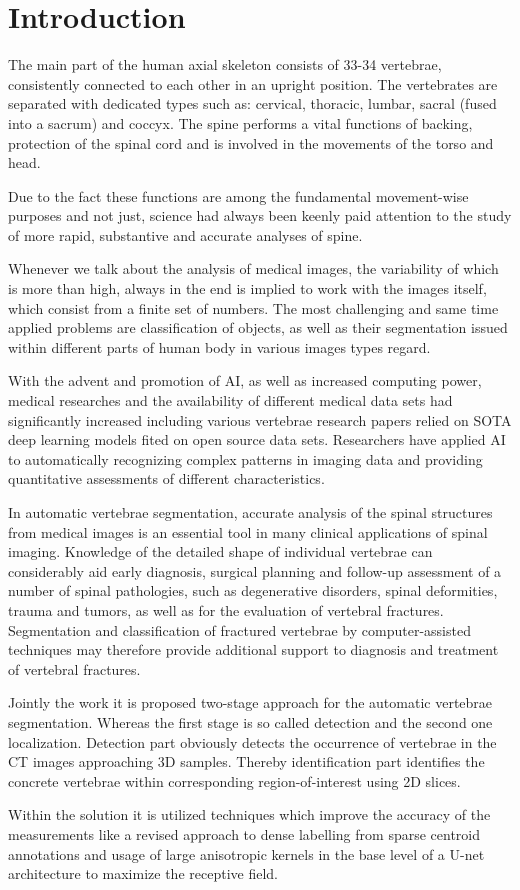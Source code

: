 \chapter{Introduction}
\label{ch:introduction}

The main part of the human axial skeleton consists of 33-34 vertebrae, consistently connected to each other in an upright position. The vertebrates are separated with dedicated types such as: cervical, thoracic, lumbar, sacral (fused into a sacrum) and coccyx. The spine performs a vital functions of backing, protection of the spinal cord and is involved in the movements of the torso and head.  
 
Due to the fact these functions are among the fundamental movement-wise purposes and not just, science had always been keenly paid attention to the study of more rapid, substantive and accurate analyses of spine.  
 
Whenever we talk about the analysis of medical images, the variability of which is more than high, always in the end is implied to work with the images itself, which consist from a finite set of numbers. The most challenging and same time applied problems are classification of objects, as well as their segmentation issued within different parts of human body in various images types regard.  
 
With the advent and promotion of AI, as well as increased computing power, medical researches and the availability of different medical data sets had significantly increased including various vertebrae research papers relied on SOTA deep learning models fited on open source data sets. Researchers have applied AI to automatically recognizing complex patterns in imaging data and providing quantitative assessments of different characteristics.  
 
In automatic vertebrae segmentation, accurate analysis of the spinal structures from medical images is an essential tool in many clinical applications of spinal imaging. Knowledge of the detailed shape of individual vertebrae can considerably aid early diagnosis, surgical planning and follow-up assessment of a number of spinal pathologies, such as degenerative disorders, spinal deformities, trauma and tumors, as well as for the evaluation of vertebral fractures. Segmentation and classification of fractured vertebrae by computer-assisted techniques may therefore provide additional support to diagnosis and treatment of vertebral fractures. 

Jointly the work it is proposed two-stage approach for the automatic vertebrae segmentation. 
Whereas the first stage is so called detection and the second one localization. 
Detection part obviously detects the occurrence of vertebrae in the CT images approaching 3D samples. Thereby identification part identifies the concrete vertebrae within corresponding region-of-interest using 2D slices.

Within the solution it is utilized techniques which improve the accuracy of the measurements
like a revised approach to dense labelling from sparse centroid annotations and usage of large anisotropic kernels in the base level of a U-net architecture to maximize the receptive field. 